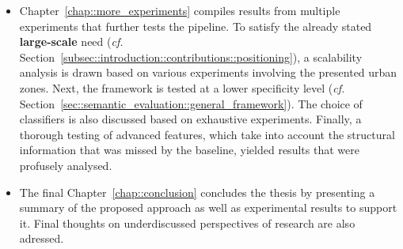 \begin{itemize}[label=\(\blacktriangleright\)]
        \item Chapter~\ref{chap::more_experiments} compiles results from multiple experiments that further tests the pipeline.
                To satisfy the already stated \textbf{large-scale} need (\textit{cf.} Section~\ref{subsec::introduction::contributions::positioning}), a scalability analysis is drawn based on various experiments involving the presented urban zones.
                Next, the framework is tested at a lower specificity level (\textit{cf.} Section~\ref{sec::semantic_evaluation::general_framework}).
                The choice of classifiers is also discussed based on exhaustive experiments.
                Finally, a thorough testing of advanced features, which take into account the structural information that was missed by the baseline, yielded results that were profusely analysed.
        \item The final Chapter~\ref{chap::conclusion} concludes the thesis by presenting a summary of the proposed approach as well as experimental results to support it.
                Final thoughts on underdiscussed perspectives of research are also adressed.
    \end{itemize}
